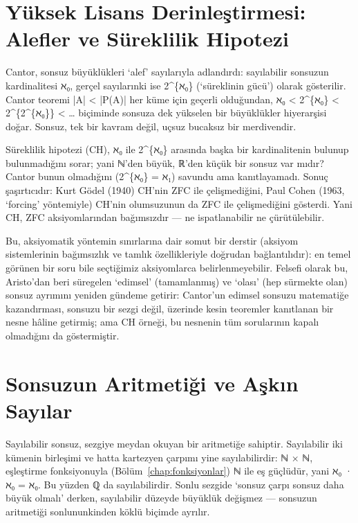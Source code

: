 \section{Yüksek Lisans Derinleştirmesi: Alefler ve Süreklilik Hipotezi}

Cantor, sonsuz büyüklükleri ‘alef’ sayılarıyla adlandırdı: sayılabilir sonsuzun kardinalitesi ℵ₀, gerçel sayılarınki ise 2\textasciicircum{}\{ℵ₀\} (‘süreklinin gücü’) olarak gösterilir. Cantor teoremi |A| < |P(A)| her küme için geçerli olduğundan, ℵ₀ < 2\textasciicircum{}\{ℵ₀\} < 2\textasciicircum{}\{2\textasciicircum{}\{ℵ₀\}\} < … biçiminde sonsuza dek yükselen bir büyüklükler hiyerarşisi doğar. Sonsuz, tek bir kavram değil, uçsuz bucaksız bir merdivendir.

Süreklilik hipotezi (CH), ℵ₀ ile 2\textasciicircum{}\{ℵ₀\} arasında başka bir kardinalitenin bulunup bulunmadığını sorar; yani ℕ’den büyük, ℝ’den küçük bir sonsuz var mıdır? Cantor bunun olmadığını (2\textasciicircum{}\{ℵ₀\} = ℵ₁) savundu ama kanıtlayamadı. Sonuç şaşırtıcıdır: Kurt Gödel (1940) CH’nin ZFC ile çelişmediğini, Paul Cohen (1963, ‘forcing’ yöntemiyle) CH’nin olumsuzunun da ZFC ile çelişmediğini gösterdi. Yani CH, ZFC aksiyomlarından bağımsızdır — ne ispatlanabilir ne çürütülebilir.

Bu, aksiyomatik yöntemin sınırlarına dair somut bir derstir (aksiyom sistemlerinin bağımsızlık ve tamlık özellikleriyle doğrudan bağlantılıdır): en temel görünen bir soru bile seçtiğimiz aksiyomlarca belirlenmeyebilir. Felsefi olarak bu, Aristo’dan beri süregelen ‘edimsel’ (tamamlanmış) ve ‘olası’ (hep sürmekte olan) sonsuz ayrımını yeniden gündeme getirir: Cantor’un edimsel sonsuzu matematiğe kazandırması, sonsuzu bir sezgi değil, üzerinde kesin teoremler kanıtlanan bir nesne hâline getirmiş; ama CH örneği, bu nesnenin tüm sorularının kapalı olmadığını da göstermiştir.

\section{Sonsuzun Aritmetiği ve Aşkın Sayılar}

Sayılabilir sonsuz, sezgiye meydan okuyan bir aritmetiğe sahiptir. Sayılabilir iki kümenin birleşimi ve hatta kartezyen çarpımı yine sayılabilirdir: ℕ × ℕ, eşleştirme fonksiyonuyla (Bölüm~\ref{chap:fonksiyonlar}) ℕ ile eş güçlüdür, yani ℵ₀ · ℵ₀ = ℵ₀. Bu yüzden ℚ da sayılabilirdir. Sonlu sezgide ‘sonsuz çarpı sonsuz daha büyük olmalı’ derken, sayılabilir düzeyde büyüklük değişmez — sonsuzun aritmetiği sonlununkinden köklü biçimde ayrılır.

